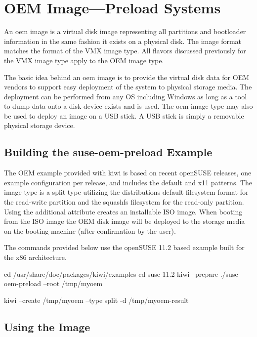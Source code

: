 \chapter{OEM Image---Preload Systems}
\label{chapter:oem}
\minitoc

An oem image is a virtual disk image representing all partitions
and bootloader information in the same fashion it exists on a physical
disk. The image format matches the format of the VMX image type. All flavors
discussed previously for the VMX image type apply to the OEM image type.

The basic idea behind an oem image is to provide the virtual disk data
for OEM vendors to support easy deployment of the system to physical
storage media. The deployment can be performed from any OS including
Windows as long as a tool to dump data onto a disk device exists and is 
used. The oem image type may also be used to deploy an image on a USB stick. 
A USB stick is simply a removable physical storage device.

\section{Building the suse-oem-preload Example}

The OEM example provided with kiwi is based on recent openSUSE releases, 
one example configuration per release, and includes the default and x11 
patterns. The image type is a split type utilizing the distributions default
filesystem format for the read-write partition and the squashfs filesystem 
for the read-only partition. Using the additional  attribute 
creates an installable ISO image. When booting from the ISO image the
OEM disk image will be deployed to the storage media on the booting machine
(after confirmation by the user).

The commands provided below use the openSUSE 11.2 based example built 
for the x86 architecture.

\begin{Command}{12cm}
cd /usr/share/doc/packages/kiwi/examples
cd suse-11.2
kiwi --prepare ./suse-oem-preload --root /tmp/myoem
\end{Command}

\begin{Command}{12cm}
kiwi --create /tmp/myoem --type split -d /tmp/myoem-result
\end{Command}

\section{Using the Image}


